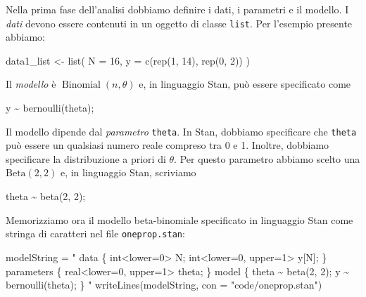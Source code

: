 \documentclass[
  11pt,
]{krantz}
\makeatletter
\newenvironment{Shaded}{\begin{snugshade}}{\end{snugshade}}
\newcommand{\AttributeTok}[1]{\textcolor[rgb]{0.61,0.61,0.61}{#1}}
\newcommand{\DecValTok}[1]{\textcolor[rgb]{0.06,0.06,0.06}{#1}}
\newcommand{\FunctionTok}[1]{\textcolor[rgb]{0,0,0}{#1}}
\newcommand{\NormalTok}[1]{#1}
\newcommand{\OtherTok}[1]{\textcolor[rgb]{0.37,0.37,0.37}{#1}}
\newcommand{\SpecialCharTok}[1]{\textcolor[rgb]{0,0,0}{#1}}
\newcommand{\StringTok}[1]{\textcolor[rgb]{0.5,0.5,0.5}{#1}}
\newenvironment{kframe}{%
\medskip{}
\setlength{\fboxsep}{.8em}
 \def\at@end@of@kframe{}%
 \ifinner\ifhmode%
  \def\at@end@of@kframe{\end{minipage}}%
  \begin{minipage}{\columnwidth}%
 \fi\fi%
 \def\FrameCommand##1{\hskip\@totalleftmargin \hskip-\fboxsep
 \colorbox{shadecolor}{##1}\hskip-\fboxsep
     \hskip-\linewidth \hskip-\@totalleftmargin \hskip\columnwidth}%
 \MakeFramed {\advance\hsize-\width
   \@totalleftmargin\z@ \linewidth\hsize
   \@setminipage}}%
 {\par\unskip\endMakeFramed%
 \at@end@of@kframe}
\renewenvironment{Shaded}{\begin{kframe}}{\end{kframe}}
\DeclareMathOperator{\Bin}{Binomial} %
\theoremstyle{definition}
\theoremstyle{definition}
\theoremstyle{definition}
\theoremstyle{definition}
\theoremstyle{remark}
\makeatother
\begin{document}
Nella prima fase dell'analisi dobbiamo definire i dati, i parametri e il modello. I \emph{dati} devono essere contenuti in un oggetto di classe \texttt{list}. Per l'esempio presente abbiamo:

\begin{Shaded}
\begin{Highlighting}[]
\NormalTok{data1\_list }\OtherTok{\textless{}{-}} \FunctionTok{list}\NormalTok{(}
  \AttributeTok{N =} \DecValTok{16}\NormalTok{,}
  \AttributeTok{y =} \FunctionTok{c}\NormalTok{(}\FunctionTok{rep}\NormalTok{(}\DecValTok{1}\NormalTok{, }\DecValTok{14}\NormalTok{), }\FunctionTok{rep}\NormalTok{(}\DecValTok{0}\NormalTok{, }\DecValTok{2}\NormalTok{))}
\NormalTok{)}
\end{Highlighting}
\end{Shaded}

Il \emph{modello} è \(\Bin(n, \theta)\) e, in linguaggio Stan, può essere specificato come

\begin{Shaded}
\begin{Highlighting}[]
\NormalTok{y }\SpecialCharTok{\textasciitilde{}} \FunctionTok{bernoulli}\NormalTok{(theta);}
\end{Highlighting}
\end{Shaded}

Il modello dipende dal \emph{parametro} \texttt{theta}. In Stan, dobbiamo specificare che \texttt{theta} può essere un qualsiasi numero reale compreso tra 0 e 1. Inoltre, dobbiamo specificare la distribuzione a priori di \(\theta\). Per questo parametro abbiamo scelto una \(\mbox{Beta}(2, 2)\) e, in linguaggio Stan, scriviamo

\begin{Shaded}
\begin{Highlighting}[]
\NormalTok{theta }\SpecialCharTok{\textasciitilde{}} \FunctionTok{beta}\NormalTok{(}\DecValTok{2}\NormalTok{, }\DecValTok{2}\NormalTok{);}
\end{Highlighting}
\end{Shaded}

Memorizziamo ora il modello beta-binomiale specificato in linguaggio Stan come stringa di caratteri nel file \texttt{oneprop.stan}:

\begin{Shaded}
\begin{Highlighting}[]
\NormalTok{modelString }\OtherTok{=} \StringTok{"}
\StringTok{data \{}
\StringTok{  int\textless{}lower=0\textgreater{} N;}
\StringTok{  int\textless{}lower=0, upper=1\textgreater{} y[N];}
\StringTok{\}}
\StringTok{parameters \{}
\StringTok{  real\textless{}lower=0, upper=1\textgreater{} theta;}
\StringTok{\}}
\StringTok{model \{}
\StringTok{  theta \textasciitilde{} beta(2, 2);}
\StringTok{  y \textasciitilde{} bernoulli(theta);}
\StringTok{\}}
\StringTok{"}
\FunctionTok{writeLines}\NormalTok{(modelString, }\AttributeTok{con =} \StringTok{"code/oneprop.stan"}\NormalTok{)}
\end{Highlighting}
\end{Shaded}
\end{document}

